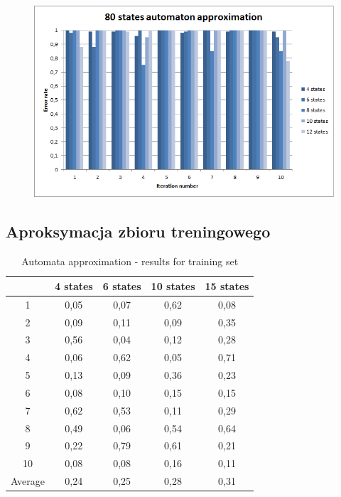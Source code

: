 \documentclass[runningheads,a4paper]{llncs}
\begin{document}
\begin{figure}
\centering
\includegraphics[scale=1]{5.png}
\end{figure}

\subsection{Aproksymacja zbioru treningowego}


\begin{table}[]
\centering
\caption{Automata approximation - results for training set}
\label{my-label}
\begin{tabular}{@{}ccccc@{}}
\toprule
        & 4 states & 6 states & 10 states & 15 states \\ \midrule
1       & 0,05     & 0,07     & 0,62      & 0,08      \\
2       & 0,09     & 0,11     & 0,09      & 0,35      \\
3       & 0,56     & 0,04     & 0,12      & 0,28      \\
4       & 0,06     & 0,62     & 0,05      & 0,71      \\
5       & 0,13     & 0,09     & 0,36      & 0,23      \\
6       & 0,08     & 0,10     & 0,15      & 0,15        \\
7       & 0,62     & 0,53     & 0,11      & 0,29        \\
8       & 0,49     & 0,06     & 0,54      & 0,64         \\
9       & 0,22     & 0,79     & 0,61      & 0,21     \\
10      & 0,08     & 0,08     & 0,16      & 0,11      \\
Average & 0,24     & 0,25     & 0,28      & 0,31      \\ \bottomrule
\end{tabular}
\end{table}
\end{document}
